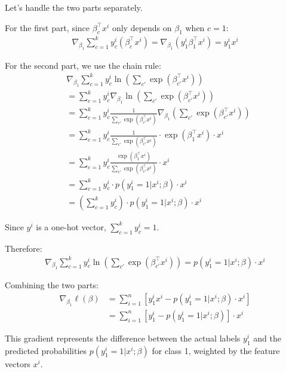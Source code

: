 \begin{itemize}
Let's handle the two parts separately.

For the first part, since $\beta_c^\top x^i$ only depends on $\beta_1$ when $c = 1$:
\begin{align*}
\nabla_{\beta_1}\sum_{c=1}^{k} y_c^i(\beta_c^\top x^i) = \nabla_{\beta_1}(y_1^i \beta_1^\top x^i) = y_1^i x^i
\end{align*}

For the second part, we use the chain rule:
\begin{align*}
&\nabla_{\beta_1}\sum_{c=1}^{k} y_c^i\ln \left(\sum_{c'}\exp(\beta_{c'}^\top x^i) \right) \\
&= \sum_{c=1}^{k} y_c^i \nabla_{\beta_1}\ln \left(\sum_{c'}\exp(\beta_{c'}^\top x^i) \right) \\
&= \sum_{c=1}^{k} y_c^i \frac{1}{\sum_{c'}\exp(\beta_{c'}^\top x^i)} \nabla_{\beta_1} \left(\sum_{c'}\exp(\beta_{c'}^\top x^i) \right) \\
&= \sum_{c=1}^{k} y_c^i \frac{1}{\sum_{c'}\exp(\beta_{c'}^\top x^i)} \cdot \exp(\beta_1^\top x^i) \cdot x^i \\
&= \sum_{c=1}^{k} y_c^i \frac{\exp(\beta_1^\top x^i)}{\sum_{c'}\exp(\beta_{c'}^\top x^i)} \cdot x^i \\
&= \sum_{c=1}^{k} y_c^i \cdot p(y_1^i=1|x^i;\beta) \cdot x^i \\
&= \left(\sum_{c=1}^{k} y_c^i\right) \cdot p(y_1^i=1|x^i;\beta) \cdot x^i
\end{align*}

Since $y^i$ is a one-hot vector, $\sum_{c=1}^{k} y_c^i = 1$.

Therefore:
\begin{align*}
\nabla_{\beta_1}\sum_{c=1}^{k} y_c^i\ln \left(\sum_{c'}\exp(\beta_{c'}^\top x^i) \right) = p(y_1^i=1|x^i;\beta) \cdot x^i
\end{align*}

Combining the two parts:
\begin{align*}
\nabla_{\beta_1}\ell(\beta) &= \sum_{i=1}^{n}\left[y_1^i x^i - p(y_1^i=1|x^i;\beta) \cdot x^i\right] \\
&= \sum_{i=1}^{n}\left[y_1^i - p(y_1^i=1|x^i;\beta)\right] \cdot x^i
\end{align*}

This gradient represents the difference between the actual labels $y_1^i$ and the predicted probabilities $p(y_1^i=1|x^i;\beta)$ for class 1, weighted by the feature vectors $x^i$.
\end{itemize}











\newpage